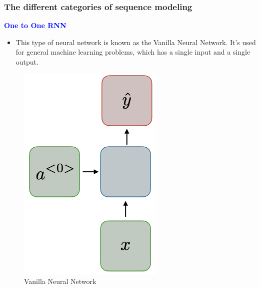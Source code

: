 \documentclass[11pt,]{beamer}
\begin{document}
\begin{frame}
	\frametitle{The different categories of sequence modeling}
	\large{\textcolor{blue}{\textbf{One to One RNN}}}
	\begin{itemize}
		\item This type of neural network is known as the Vanilla Neural Network. It's used for general machine learning problems, which has a single input and a single output.
	\end{itemize}
	\begin{figure}[h]
		\centering
		\includegraphics[scale=0.35]{Images/rnn-one-to-one-ltr.png}
		\caption{Vanilla Neural Network}
	\end{figure}
\end{frame}
\end{document}
